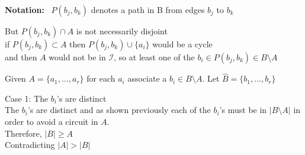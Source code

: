 \documentclass{article}
\theoremstyle{plain}
\theoremstyle{definition}
\theoremstyle{remark}
\newcommand\Notation{%
  \textbf{Notation:}~%
}
\begin{document}
 \vspace{2mm}
 
 \begin{minipage}{.2\textwidth}
 \end{minipage}
\hspace{4cm} \begin{minipage}{.2\textwidth}
 \end{minipage}
 
 \vspace{2mm}
 
 \noindent\Notation $ P ( b_j, b_k ) $ denotes a path in B from edges $ b_j $ to $ b_k $
 
 \vspace{2mm}
 
\noindent But $ P(b_j,b_k) \cap A $ is not necessarily disjoint\\
\noindent if $ P(b_j,b_k) \subset A  $ then $ P(b_j,b_k) \cup \{ a_i \} $  would be a cycle\\ and then $ A$ would not be in $ \mathcal{I} $, so at least one of the $ b_i \in P(b_j,b_k) \in B \setminus A $
 
 \vspace{4mm}
 
 \noindent Given $A = \{a_1, ... ,a_r\} $ for each $a_i$ associate a $b_i \in B \setminus A$. Let $\hat{B} = \{b_1, ... ,b_r\}$
 
 \vspace{2mm}
 
 \noindent Case 1: The $ b_i$'s are distinct\\
 The $ b_i$'s are distinct and as shown previously each of the $ b_i$'s must be in $ |B \setminus A| $ in order to avoid a circuit in $ A $.\\ 
\noindent Therefore,
  $ |B| \geqslant A $ \\Contradicting $ |A|  >  |B| $
 
\end{document}
